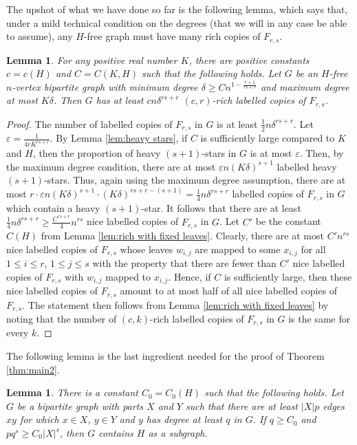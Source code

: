 \documentclass[11pt]{article}
\numberwithin{equation}{section}
\newtheorem{lemma}[theorem]{\bf Lemma}
\theoremstyle{definition}
\def\eps{\varepsilon}
\begin{document}
The upshot of what we have done so far is the following lemma, which says that, under a mild technical condition on the degrees (that we will in any case be able to assume), any $H$-free graph must have many rich copies of $F_{r,s}$.

\begin{lemma} \label{lem:many rich}
	For any positive real number $K$, there are positive constants $c=c(H)$ and $C=C(K,H)$ such that the following holds. Let $G$ be an $H$-free $n$-vertex bipartite graph with minimum degree $\delta\geq Cn^{1-\frac{r+1}{rs+r}}$ and maximum degree at most $K\delta$. Then $G$ has at least $cn\delta^{rs+r}$ $(c,r)$-rich labelled copies of $F_{r,s}$.
\end{lemma}

\begin{proof}
	The number of labelled copies of $F_{r,s}$ in $G$ is at least $\frac{1}{2}n\delta^{rs+r}$. Let $\eps=\frac{1}{4rK^{rs+r}}$. By Lemma \ref{lem:heavy stars}, if $C$ is sufficiently large compared to $K$ and $H$, then the proportion of heavy $(s+1)$-stars in $G$ is at most $\eps$. Then, by the maximum degree condition, there are at most $\eps n(K\delta)^{s+1}$ labelled heavy $(s+1)$-stars. Thus, again using the maximum degree assumption, there are at most $r\cdot \eps n (K\delta)^{s+1}\cdot (K\delta)^{rs+r-(s+1)}=\frac{1}{4}n\delta^{rs+r}$ labelled copies of $F_{r,s}$ in $G$ which contain a heavy $(s+1)$-star. It follows that there are at least $\frac{1}{4}n\delta^{rs+r}\geq \frac{C^{rs+r}}{4}n^{rs}$ nice labelled copies of $F_{r,s}$ in $G$. Let $C'$ be the constant $C(H)$ from Lemma \ref{lem:rich with fixed leaves}. Clearly, there are at most $C'n^{rs}$ nice labelled copies of $F_{r,s}$ whose leaves $w_{i,j}$ are mapped to some $x_{i,j}$ for all $1\leq i\leq r$, $1\leq j\leq s$ with the property that there are fewer than $C'$ nice labelled copies of $F_{r,s}$ with $w_{i,j}$ mapped to $x_{i,j}$. Hence, if $C$ is sufficiently large, then these nice labelled copies of $F_{r,s}$ amount to at most half of all nice labelled copies of $F_{r,s}$. The statement then follows from Lemma \ref{lem:rich with fixed leaves} by noting that the number of $(c,k)$-rich labelled copies of $F_{r,s}$ in $G$ is the same for every $k$.
\end{proof}

The following lemma is the last ingredient needed for the proof of Theorem \ref{thm:main2}.

\begin{lemma} \label{lem:dependent random choice}
	There is a constant $C_0=C_0(H)$ such that the following holds. Let $G$ be a bipartite graph with parts $X$ and $Y$ such that there are at least $|X|p$ edges $xy$ for which $x\in X$, $y\in Y$ and $y$ has degree at least $q$ in $G$. If $q\geq C_0$ and $pq^s\geq C_0|X|^s$, then $G$ contains $H$ as a subgraph.
\end{lemma}
\end{document}
